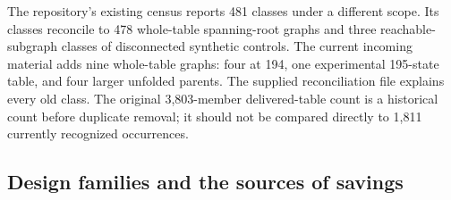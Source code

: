 \documentclass[11pt,letterpaper]{article}
\begin{document}
The repository's existing census reports 481 classes under a different
scope. Its classes reconcile to 478 whole-table spanning-root graphs and
three reachable-subgraph classes of disconnected synthetic controls.
The current incoming material adds nine whole-table graphs: four at 194,
one experimental 195-state table, and four larger unfolded parents.
The supplied reconciliation file explains every old class. The original
3,803-member delivered-table count is a historical count before duplicate
removal; it should not be compared directly to 1,811 currently recognized
occurrences.

\subsection{Design families and the sources of savings}
\end{document}
